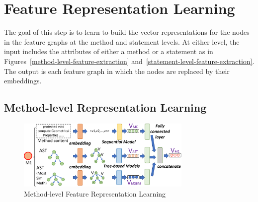 \section{Feature Representation Learning}
\label{feature-learning:sec}

The goal of this step is to learn to build the vector representations
for the nodes in the feature graphs at the method and statement levels.
At either level, the input includes the attributes of either a method
or a statement as in Figures~\ref{method-level-feature-extraction}
and~\ref{statement-level-feature-extraction}. The output is each
feature graph in which the nodes are replaced by their embeddings.



\subsection{Method-level Representation Learning}

\begin{figure}[t]
	\centering
	\includegraphics[width=3.3in]{graphs/step-2-method-new-2.png}
        \vspace{-8pt}
	\caption{Method-level Feature Representation Learning}
	\label{method-level-feature-learning}
\end{figure}



